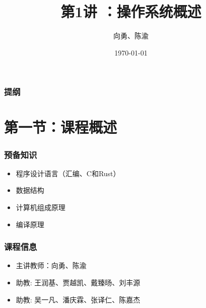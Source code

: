 \documentclass[UTF8]{ctexbeamer}
\title[第1讲]{第1讲 ：操作系统概述} %
\author{向勇、陈渝} %
\institute[清华大学] %
{
清华大学计算机系 \\ %
\medskip
\textit{xyong,yuchen@tsinghua.edu.cn} %
}
\date{\today} %
\begin{document}
\begin{frame}
\titlepage %
\end{frame}

\begin{frame}
\frametitle{提纲} %
\tableofcontents %
\end{frame}


\section{第一节：课程概述} %

\begin{frame}

\frametitle{预备知识}

\begin{itemize}

\item 程序设计语言（汇编、C和Rust）

\item 数据结构

\item 计算机组成原理

\item 编译原理

\end{itemize}

\end{frame}

\begin{frame}
	\frametitle{课程信息}
	\begin{itemize}
		\item 主讲教师：向勇、陈渝
		\item 助教: 王润基、贾越凯、戴臻旸、刘丰源
		\item 助教: 吴一凡、潘庆霖、张译仁、陈嘉杰
	\end{itemize}
\end{frame}
\end{document}
